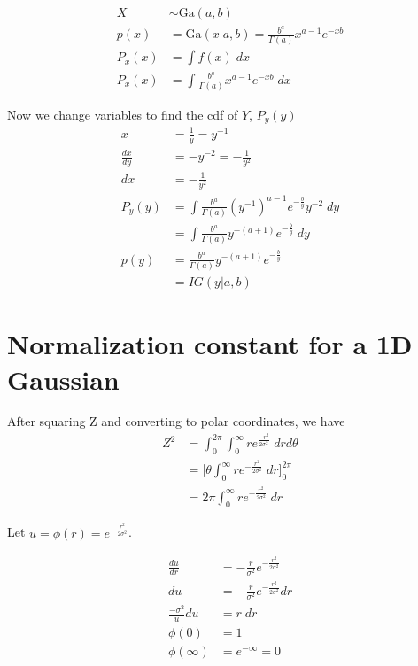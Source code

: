 \documentclass{article}
\begin{document}
\begin{align*}
  X &\sim \text{Ga}(a,b) \\
  p(x) &= \text{Ga}(x|a,b) = \frac{b^a}{\Gamma(a)} x^{a-1}e^{-xb} \\
  P_{x}(x) &= \int{f(x) \; dx} \\
  P_{x}(x) &= \int{\frac{b^{a}}{\Gamma(a)} x^{a-1} e^{-xb} \; dx}
\end{align*}

Now we change variables to find the cdf of $Y$, $P_{y}(y)$
\begin{align*}
  x &= \frac{1}{y} = y^{-1} \\
  \frac{dx}{dy} &= -y^{-2} = -\frac{1}{y^{2}} \\
  dx &= -\frac{1}{y^{2}} \\
  P_{y}(y) &= \int{ \frac{b^{a}}{\Gamma(a)}
             \left( y^{-1} \right) ^{a-1} e^{-\frac{b}{y}}
             y^{-2} \; dy} \\
    &= \int{ \frac{b^{a}}{\Gamma(a)}
      y^{-(a+1)} e^{-\frac{b}{y}}} \; dy \\
  p(y) &= \frac{b^{a}}{\Gamma(a)}
      y^{-(a+1)} e^{-\frac{b}{y}} \\
  &= IG(y|a,b)
\end{align*}

\section{Normalization constant for a 1D Gaussian}

After squaring Z and converting to polar coordinates, we have
\begin{align*}
  Z^{2} &= \int_0^{2\pi} \int_0^\infty re^{\frac{-r^{2}}{2\sigma^{2}}}
          \; dr d\theta \\
  &= \Big[ \theta \int_0^\infty{re^{-\frac{r^{2}}{2\sigma^{2}}} \; dr}
    \Big]_0^{2\pi} \\
  &= 2\pi \int_0^\infty{re^{-\frac{r^{2}}{2\sigma^{2}}}} \; dr
\end{align*}

Let $u = \phi(r) = e^{-\frac{r^{2}}{2\sigma^{2}}}$.

\begin{align*}
  \frac{du}{dr} &= -\frac{r}{\sigma^{2}}
                  e^{-\frac{r^{2}}{2\sigma^{2}}} \\
  du &= -\frac{r}{\sigma^{2}}
                  e^{-\frac{r^{2}}{2\sigma^{2}}} dr \\
  \frac{-\sigma^{2}}{u} du &= r \; dr \\
  \phi(0) &= 1 \\
  \phi(\infty) &= e^{-\infty} = 0
\end{align*}
\end{document}
